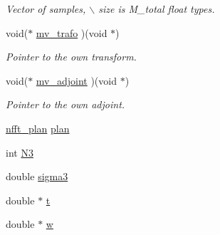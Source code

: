 \begin{CompactItemize}
\begin{CompactList}\small\item\em Vector of samples, $\backslash$ size is M\_\-total float types. \item\end{CompactList}\item 
\hypertarget{structmri__inh__2d1d__plan_4cad33b38f4d5bc54b8d25d90913ab44}{
void($\ast$ \hyperlink{structmri__inh__2d1d__plan_4cad33b38f4d5bc54b8d25d90913ab44}{mv\_\-trafo} )(void $\ast$)}
\label{structmri__inh__2d1d__plan_4cad33b38f4d5bc54b8d25d90913ab44}

\begin{CompactList}\small\item\em Pointer to the own transform. \item\end{CompactList}\item 
\hypertarget{structmri__inh__2d1d__plan_fe427225384a2d226c3cb85cf9aa4042}{
void($\ast$ \hyperlink{structmri__inh__2d1d__plan_fe427225384a2d226c3cb85cf9aa4042}{mv\_\-adjoint} )(void $\ast$)}
\label{structmri__inh__2d1d__plan_fe427225384a2d226c3cb85cf9aa4042}

\begin{CompactList}\small\item\em Pointer to the own adjoint. \item\end{CompactList}\item 
\hypertarget{structmri__inh__2d1d__plan_c911bea7fd2e5b81f3f7a917842d6bc7}{
\hyperlink{structnfft__plan}{nfft\_\-plan} \hyperlink{structmri__inh__2d1d__plan_c911bea7fd2e5b81f3f7a917842d6bc7}{plan}}
\label{structmri__inh__2d1d__plan_c911bea7fd2e5b81f3f7a917842d6bc7}

\item 
\hypertarget{structmri__inh__2d1d__plan_9776bd2e03278b7cbdef2b4dce19dbc1}{
int \hyperlink{structmri__inh__2d1d__plan_9776bd2e03278b7cbdef2b4dce19dbc1}{N3}}
\label{structmri__inh__2d1d__plan_9776bd2e03278b7cbdef2b4dce19dbc1}

\item 
\hypertarget{structmri__inh__2d1d__plan_94c6285d9cfeb7e358dd4990245639e7}{
double \hyperlink{structmri__inh__2d1d__plan_94c6285d9cfeb7e358dd4990245639e7}{sigma3}}
\label{structmri__inh__2d1d__plan_94c6285d9cfeb7e358dd4990245639e7}

\item 
\hypertarget{structmri__inh__2d1d__plan_e80cae06faca26a12bbbb896d5d7c527}{
double $\ast$ \hyperlink{structmri__inh__2d1d__plan_e80cae06faca26a12bbbb896d5d7c527}{t}}
\label{structmri__inh__2d1d__plan_e80cae06faca26a12bbbb896d5d7c527}

\item 
\hypertarget{structmri__inh__2d1d__plan_22ed3402646ded705084299c84d97a62}{
double $\ast$ \hyperlink{structmri__inh__2d1d__plan_22ed3402646ded705084299c84d97a62}{w}}
\label{structmri__inh__2d1d__plan_22ed3402646ded705084299c84d97a62}

\end{CompactItemize}


